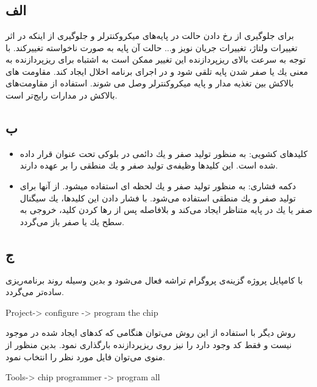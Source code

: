 \documentclass{article}
\begin{document}


\tableofcontents
\newpage

\section{}
\subsection{الف}
برای جلوگیری از رخ دادن حالت  در پایه‌های میکروکنترلر و جلوگیری از اینکه در اثر تغییرات ولتاژ، تغییرات جریان نویز و... حالت آن پایه به صورت ناخواسته تغییرکند. با توجه به سرعت بالای ریزپردازنده این تغییر ممکن است به اشتباه برای ریزپردازنده به معنی یك یا صفر شدن پایه تلقی شود و در اجرای برنامه اخلال ایجاد کند. مقاومت های بالاکش بین تغذیه مدار و پایه میکروکنترلر وصل می شوند. استفاده از مقاومت‌های بالاکش در مدارات رایج‌تر است.
\subsection{ب}
\begin{itemize}
	\item کلیدهای کشویی: به منظور تولید صفر و یك دائمی در بلوکی تحت عنوان  قرار داده شده است. این کلیدها وظیفه‌ی تولید صفر و یك منطقی را بر عهده دارند.
	\item دکمه فشاری: به منظور تولید صفر و یك لحظه ای استفاده میشود. از آنها برای تولید صفر و یك منطقی استفاده می‌شود. با فشار دادن این کلیدها، یك سیگنال صفر یا یك در پایه متناظر ایجاد می‌کند و بلافاصله پس از رها کردن کلید، خروجی به سطح یك یا صفر باز می‌گردد.
\end{itemize}

\subsection{ج}
با کامپایل پروژه گزینه‌ی پروگرام تراشه فعال می‌شود و بدین وسیله روند برنامه‌ریزی ساده‌تر می‌گردد.
\begin{latin}
Project-> configure -> program the chip
\end{latin}
روش دیگر با استفاده از این روش می‌توان هنگامی که کدهای ایجاد شده در  موجود نیست و فقط کد  وجود دارد را نیز روی ریزپردازنده بارگذاری نمود. بدین منظور از منوی  می‌توان فایل  مورد نظر را انتخاب نمود.
\begin{latin}
Tools-> chip programmer -> program all
\end{latin}
\end{document}
